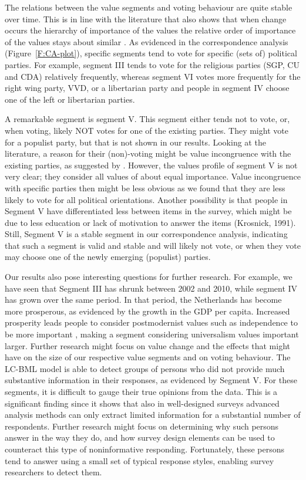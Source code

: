 \documentclass[12pt,letter]{article}\usepackage[]{graphicx}\usepackage[]{xcolor}
\begin{document}
The relations between the value segments and voting behaviour are quite stable over time. This is in line with the literature that also shows that when change occurs the hierarchy of importance of the values the relative order of importance of the values stays about similar \citep{vecchione2016} . As evidenced in the correspondence analysis (Figure~\ref{F:CA-plot}), specific segments tend to vote for specific (sets of) political parties. For example, segment III tends to vote for the religious parties (SGP, CU and CDA) relatively frequently, whereas segment VI votes more frequently for the right wing party, VVD, or a libertarian party and people in segment IV choose one of the left or libertarian parties. 


A remarkable segment is segment V. This segment either tends not to vote, or, when voting, likely NOT votes for one of the existing parties. They might vote for a populist party, but that is not shown in our results. Looking at the literature, a reason for their (non)-voting might be  value incongruence with the existing parties, as suggested by \citet{caprara2012}. However, the values profile of segment V is not very clear; they consider all values of about equal importance. Value incongruence with specific parties then might be less obvious as we found that they are less likely to vote for all political orientations. Another possibility is that people in Segment V have differentiated less between items in the survey, which might be due to less education or lack of motivation to answer the items (Krosnick, 1991). Still, Segment V is a stable segment in our correspondence analysis, indicating that such a segment is valid and stable and will likely not vote, or when they vote may choose one of the newly emerging (populist) parties.

Our results also pose interesting questions for further research. For example, we have seen that Segment III has shrunk between 2002 and 2010, while segment IV has grown over the same period. In that period, the Netherlands has become more prosperous, as evidenced by the growth in the GDP per capita. Increased prosperity leads people to consider postmodernist values such as independence to be more important \citep{inglehart2000}, making a segment considering universalism values important larger. Further research might focus on value change and the effects that might have on the size of our respective value segments and on voting behaviour. The LC-BML model is able to detect groups of persons who did not provide much substantive information in their responses, as evidenced by Segment  V. For these segments, it is difficult to gauge their true opinions from the data. This is a significant finding since it shows that also in well-designed surveys advanced analysis methods can only extract limited information for a substantial number of respondents. Further research might focus on determining why such persons answer in the way they do, and how survey design elements can be used to counteract this type of noninformative responding. Fortunately, these persons tend to answer using a small set of typical response styles, enabling survey researchers to detect them.
\end{document}
